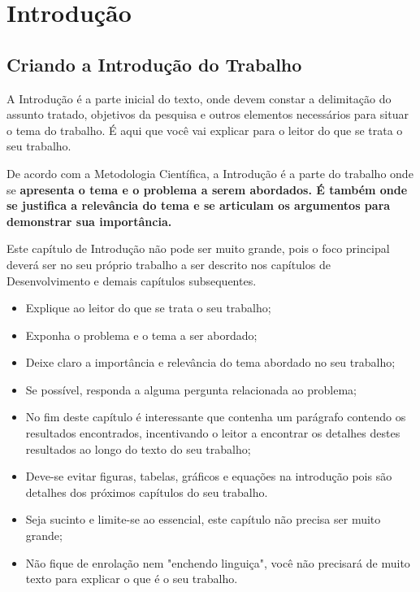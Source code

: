 %
\chapter{Introdução}


\section{Criando a Introdução do Trabalho}

A Introdução é a parte inicial do texto, onde devem constar a delimitação do assunto tratado, objetivos da pesquisa e outros elementos necessários para situar o tema do trabalho. É aqui que você vai explicar para o leitor do que se trata o seu trabalho.

De acordo com a Metodologia Científica, a Introdução é a parte do trabalho onde se {\bf apresenta o tema e o problema a serem abordados. É também onde se justifica a relevância do tema e se articulam os argumentos para demonstrar sua importância.}

Este capítulo de Introdução não pode ser muito grande, pois o foco principal deverá ser no seu próprio trabalho a ser descrito nos capítulos de Desenvolvimento e demais capítulos subsequentes. 
    
\begin{itemize}
    \item Explique ao leitor do que se trata o seu trabalho;
    \item Exponha o problema e o tema a ser abordado;
    \item Deixe claro a importância e relevância do tema abordado no seu trabalho;
    \item Se possível, responda a alguma pergunta relacionada ao problema;
    \item No fim deste capítulo é interessante que contenha um parágrafo contendo os resultados encontrados, incentivando o leitor a encontrar os detalhes destes resultados ao longo do texto do seu trabalho;
    \item Deve-se evitar figuras, tabelas, gráficos e equações na introdução pois são detalhes dos próximos capítulos do seu trabalho.
    \item Seja sucinto e limite-se ao essencial, este capítulo não precisa ser muito grande;
    \item Não fique de enrolação nem "enchendo linguiça", você não precisará de muito texto para explicar o que é o seu trabalho.
\end{itemize}

